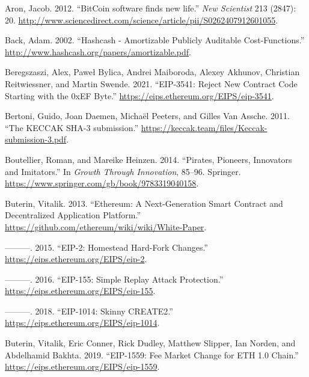 \documentclass[
]{ltjsarticle}
\newlength{\cslhangindent}
\newlength{\cslentryspacingunit} %
\newenvironment{CSLReferences}[2] %
 {%
  \setlength{\parindent}{0pt}
  \ifodd #1
  \let\oldpar\par
  \def\par{\hangindent=\cslhangindent\oldpar}
  \fi
  \setlength{\parskip}{#2\cslentryspacingunit}
 }%
 {}
\begin{document}
\hypertarget{refs}{}
\begin{CSLReferences}{1}{0}
\leavevmode{}%
Aron, Jacob. 2012. ``{BitCoin software finds new life}.'' \emph{New
Scientist} 213 (2847): 20.
\url{http://www.sciencedirect.com/science/article/pii/S0262407912601055}.

\leavevmode{}%
Back, Adam. 2002. ``Hashcash - Amortizable Publicly Auditable
Cost-Functions.'' \url{http://www.hashcash.org/papers/amortizable.pdf}.

\leavevmode{}%
Beregszaszi, Alex, Paweł Bylica, Andrei Maiboroda, Alexey Akhunov,
Christian Reitwiessner, and Martin Swende. 2021. ``EIP-3541: Reject New
Contract Code Starting with the 0xEF Byte.''
\url{https://eips.ethereum.org/EIPS/eip-3541}.

\leavevmode{}%
Bertoni, Guido, Joan Daemen, Michaël Peeters, and Gilles Van Assche.
2011. ``{The KECCAK SHA-3 submission}.''
\url{https://keccak.team/files/Keccak-submission-3.pdf}.

\leavevmode{}%
Boutellier, Roman, and Mareike Heinzen. 2014. ``{Pirates, Pioneers,
Innovators and Imitators}.'' In \emph{Growth Through Innovation},
85--96. Springer. \url{https://www.springer.com/gb/book/9783319040158}.

\leavevmode{}%
Buterin, Vitalik. 2013. ``{Ethereum: A Next-Generation Smart Contract
and Decentralized Application Platform}.''
\url{https://github.com/ethereum/wiki/wiki/White-Paper}.

\leavevmode{}%
---------. 2015. ``EIP-2: Homestead Hard-Fork Changes.''
\url{https://eips.ethereum.org/EIPS/eip-2}.

\leavevmode{}%
---------. 2016. ``EIP-155: Simple Replay Attack Protection.''
\url{https://eips.ethereum.org/EIPS/eip-155}.

\leavevmode{}%
---------. 2018. ``EIP-1014: Skinny CREATE2.''
\url{https://eips.ethereum.org/EIPS/eip-1014}.

\leavevmode{}%
Buterin, Vitalik, Eric Conner, Rick Dudley, Matthew Slipper, Ian Norden,
and Abdelhamid Bakhta. 2019. ``EIP-1559: Fee Market Change for ETH 1.0
Chain.'' \url{https://eips.ethereum.org/EIPS/eip-1559}.


\end{CSLReferences}
\end{document}
